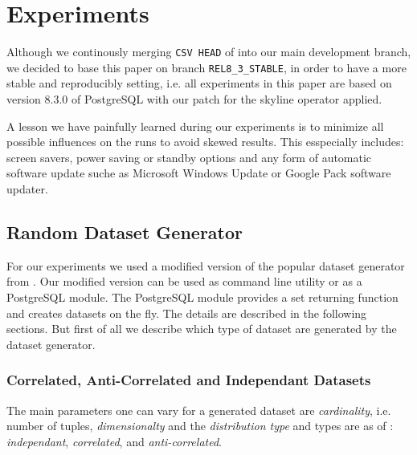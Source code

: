 \section{Experiments}

Although we continously merging \texttt{CSV HEAD} of  into our main development branch, we decided
to base this paper on branch \texttt{REL8\_3\_STABLE}, in order to
have a more stable and reproducibly setting, i.e. all experiments in
this paper are based on version 8.3.0 of PostgreSQL with our patch for
the skyline operator applied.

A lesson we have painfully learned during our experiments is to
minimize all possible influences on the runs to avoid skewed
results. This esspecially includes: screen savers, power saving or
standby options and any form of automatic software update suche as
Microsoft Windows Update or Google Pack software updater.



\subsection{Random Dataset Generator}

For our experiments we used a modified version \citep{Eder2007a} of
the popular dataset generator from \citep{Borzsonyi2001}.  Our
modified version can be used as command line utility or as a
PostgreSQL module. The PostgreSQL module provides a set returning
function and creates datasets on the fly.  The details are described
in the following sections.  But first of all we describe which type of
dataset are generated by the dataset generator.

\subsubsection{Correlated, Anti-Correlated and Independant Datasets}
\label{sec:corr-anti-indep}

The main parameters one can vary for a generated dataset are
\emph{cardinality}, i.e. number of tuples, \emph{dimensionalty} and
the \emph{distribution type} and types are as of \citep{Borzsonyi2001}: 
\emph{independant}, \emph{correlated}, and \emph{anti-correlated}.

